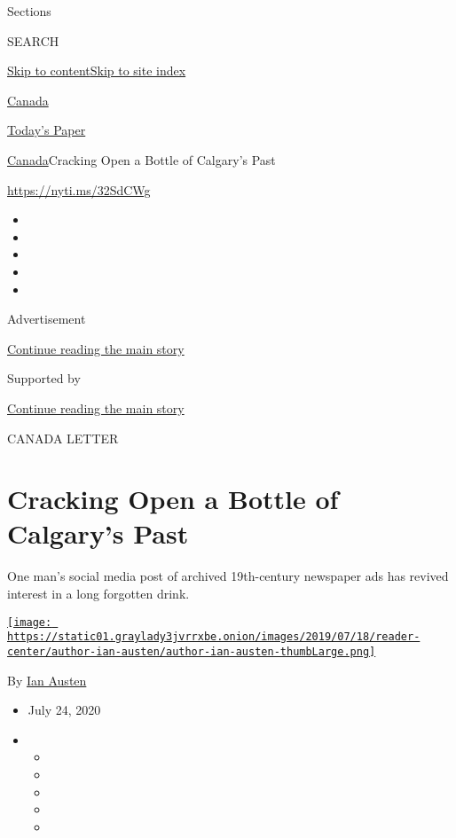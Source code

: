 Sections

SEARCH

\protect\hyperlink{site-content}{Skip to
content}\protect\hyperlink{site-index}{Skip to site index}

\href{https://www.nytimes3xbfgragh.onion/section/world/canada}{Canada}

\href{https://myaccount.nytimes3xbfgragh.onion/auth/login?response_type=cookie\&client_id=vi}{}

\href{https://www.nytimes3xbfgragh.onion/section/todayspaper}{Today's
Paper}

\href{/section/world/canada}{Canada}\textbar{}Cracking Open a Bottle of
Calgary's Past

\url{https://nyti.ms/32SdCWg}

\begin{itemize}
\item
\item
\item
\item
\item
\end{itemize}

Advertisement

\protect\hyperlink{after-top}{Continue reading the main story}

Supported by

\protect\hyperlink{after-sponsor}{Continue reading the main story}

CANADA LETTER

\hypertarget{cracking-open-a-bottle-of-calgarys-past}{%
\section{Cracking Open a Bottle of Calgary's
Past}\label{cracking-open-a-bottle-of-calgarys-past}}

One man's social media post of archived 19th-century newspaper ads has
revived interest in a long forgotten drink.

\href{https://www.nytimes3xbfgragh.onion/by/ian-austen}{\texttt{[image: https://static01.graylady3jvrrxbe.onion/images/2019/07/18/reader-center/author-ian-austen/author-ian-austen-thumbLarge.png]}}

By \href{https://www.nytimes3xbfgragh.onion/by/ian-austen}{Ian Austen}

\begin{itemize}
\item
  July 24, 2020
\item
  \begin{itemize}
  \item
  \item
  \item
  \item
  \item
  \end{itemize}
\end{itemize}

